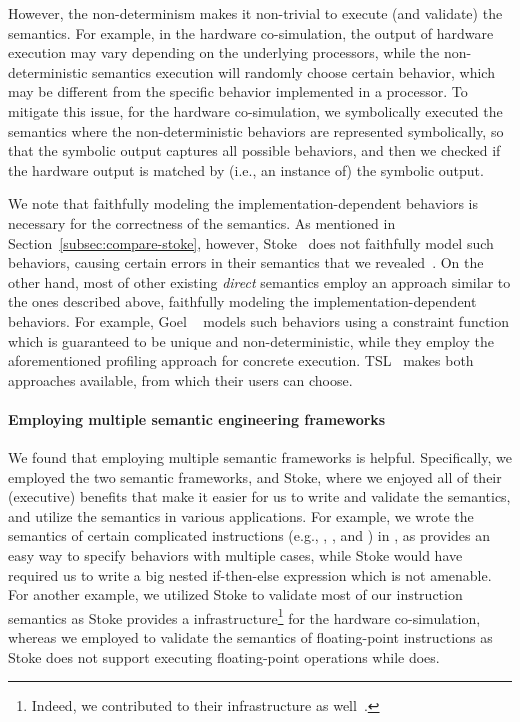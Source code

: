 {However, the non-determinism makes it non-trivial to execute (and validate) the semantics.
For example, in the hardware co-simulation, the output of hardware execution may vary depending on the underlying processors, while the non-deterministic semantics execution will randomly choose certain behavior, which may be different from the specific behavior implemented in a processor.
To mitigate this issue, for the hardware co-simulation, we symbolically executed the semantics where the non-deterministic behaviors are represented symbolically, so that the symbolic output captures all possible behaviors, and then we checked if the hardware output is matched by (i.e., an instance of) the symbolic output. 

We note that faithfully modeling the implementation-dependent behaviors is necessary for the correctness of the semantics.
As mentioned in Section~\ref{subsec:compare-stoke}, however, Stoke~\cite{Stoke2013} does not faithfully model such behaviors, causing certain errors in their semantics that we revealed~\cite{Suppl}.
On the other hand, most of other existing \emph{direct} \ISA semantics employ an approach similar to the ones described above, faithfully modeling the implementation-dependent behaviors.
For example, Goel \etal~\cite{Goel:ProCoS17} models such behaviors using a constraint function which is guaranteed to be unique and non-deterministic, while they employ the aforementioned profiling approach for concrete execution.
TSL~\cite{TSL:TOPLAS13} makes both approaches available, from which their users can choose.

\paragraph{Employing multiple semantic engineering frameworks}

We found that employing multiple semantic frameworks is helpful. Specifically, we employed the two semantic frameworks, \K and Stoke, where we enjoyed all of their (executive) benefits that make it easier for us to write and validate the semantics, and utilize the semantics in various applications. For example, we wrote the semantics of certain complicated instructions (e.g., , , and ) in \K, as \K provides an easy way to specify behaviors with multiple cases, while Stoke would have required us to write a big nested if-then-else expression which is not amenable. For another example, we utilized Stoke to validate most of our instruction semantics as Stoke provides a infrastructure\footnote{Indeed, we contributed to their infrastructure as well~\cite{completing-stock,improving-stoke}.} for the hardware co-simulation, whereas we employed \K to validate the semantics of floating-point instructions as Stoke does not support executing floating-point operations while \K does.

}
